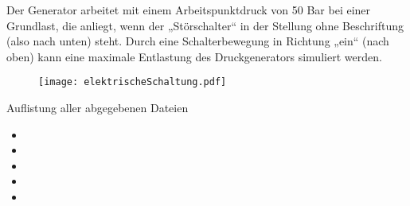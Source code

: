 \documentclass[11pt, a4paper,parskip=half]{article}
\begin{document}
Der Generator arbeitet mit einem Arbeitspunktdruck von 50 Bar bei einer Grundlast, die anliegt, wenn der „Störschalter“ in der Stellung ohne Beschriftung (also nach unten) steht. Durch eine Schalterbewegung in Richtung „ein“ (nach oben) kann eine maximale Entlastung des Druckgenerators simuliert werden.


\begin{figure}[htbp]
	\begin{center}
		\texttt{[image: elektrischeSchaltung.pdf]} 
	\end{center} 
\end{figure}


\newpage
\begin{huge}
Auflistung aller abgegebenen Dateien\\

\end{huge}

\begin{itemize}
\item
\item
\item
\item
\item
\end{itemize}



\newpage
\tableofcontents %



\newpage
\listoffigures		%

\newpage
\begin{appendix}
  
\end{appendix}

\clearpage
\newpage
{}


\end{document}
